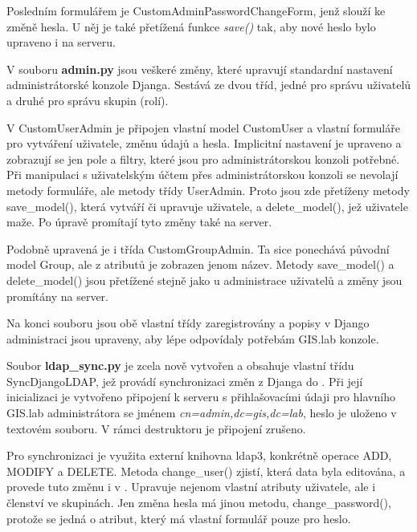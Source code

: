 Posledním formulářem je \textsf{CustomAdminPasswordChangeForm}, jenž slouží ke změně hesla. U něj je také přetížená funkce \textit{save()} tak, aby nové heslo bylo upraveno i na serveru.

V souboru \textbf{admin.py} jsou veškeré změny, které upravují standardní nastavení administrátorské konzole Djanga. Sestává ze dvou tříd, jedné pro správu uživatelů a druhé pro správu skupin (rolí). 

V \textsf{CustomUserAdmin} je připojen vlastní model \textsf{CustomUser} a vlastní formuláře pro vytváření uživatele, změnu údajů a hesla. Implicitní nastavení je upraveno a zobrazují se jen pole a filtry, které jsou pro administrátorskou konzoli potřebné. Při manipulaci s uživatelským účtem přes administrátorskou konzoli se nevolají metody formuláře, ale metody třídy \textsf{UserAdmin}. Proto jsou zde přetíženy metody \textsf{save\_model()}, která vytváří či upravuje uživatele, a \textsf{delete\_model()}, jež uživatele maže. Po úpravě promítají tyto změny také na  server.

Podobně upravená je i třída \textsf{CustomGroupAdmin}. Ta sice ponechává původní model \textsf{Group}, ale z atributů je zobrazen jenom název. Metody \textsf{save\_model()} a \textsf{delete\_model()} jsou přetížené stejně jako u administrace uživatelů a změny jsou promítány na  server.

Na konci souboru jsou obě vlastní třídy zaregistrovány a popisy v Django administraci jsou upraveny, aby lépe odpovídaly potřebám GIS.lab konzole.

Soubor \textbf{ldap\_sync.py} je zcela nově vytvořen a obsahuje vlastní třídu \textsf{SyncDjangoLDAP}, jež provádí synchronizaci změn z Djanga do . Při její inicializaci je vytvořeno připojení k  serveru s přihlašovacími údaji pro hlavního GIS.lab administrátora se jménem \textit{cn=admin,dc=gis,dc=lab}, heslo je uloženo v textovém souboru. V rámci destruktoru je připojení zrušeno. 

Pro synchronizaci je využita externí knihovna ldap3, konkrétně operace \textsf{ADD}, \textsf{MODIFY} a \textsf{DELETE}. Metoda \textsf{change\_user()} zjistí, která data byla editována, a provede tuto změnu i v . Upravuje nejenom vlastní atributy uživatele, ale i členství ve skupinách. Jen změna hesla má jinou metodu, \textsf{change\_password()}, protože se jedná o atribut, který má vlastní formulář pouze pro heslo. 

